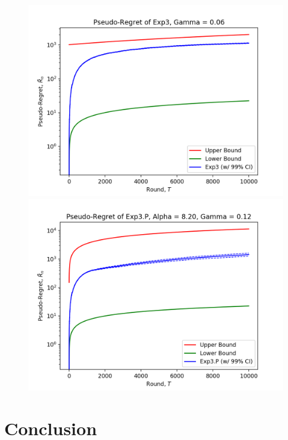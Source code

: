 \documentclass[12pt]{article}
\begin{document}
\begin{figure}[H]
\begin{minipage}[h]{0.5\linewidth}
\includegraphics[width=\linewidth, height=0.75\linewidth]{exp3-1.png}
\end{minipage}
\begin{minipage}[h]{0.5\linewidth}
\includegraphics[width=\linewidth, height=0.75\linewidth]{exp3P-1.png}
\end{minipage}
\end{figure}

\section{Conclusion}

\newpage
\printbibliography
\end{document}
